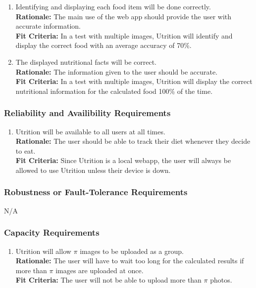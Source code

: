 \documentclass[12pt]{article}
\begin{document}
{\begin{enumerate}[start=4,label={PR\arabic*.}]
	\item Identifying and displaying each food item will be done correctly. \\
	\textbf{Rationale:} The main use of the web app should provide the user with accurate information. \\
	\textbf{Fit Criteria:} In a test with multiple images, Utrition will identify and display the correct food with an average accuracy of 70\%.
	\item  The displayed nutritional facts will be correct. \\
	\textbf{Rationale:} The information given to the user should be accurate. \\
	\textbf{Fit Criteria:} In a test with multiple images, Utrition will display the correct nutritional information for the calculated food 100\% of the time.
\end{enumerate}

\subsubsection{Reliability and Availibility Requirements}

\begin{enumerate}[{PR}6. ] 
	\item Utrition will be available to all users at all times.\\
	\textbf{Rationale:} The user should be able to track their diet whenever they decide to eat. \\
	\textbf{Fit Criteria:} Since Utrition is a local webapp, the user will always be allowed to use Utrition unless their device is down.
\end{enumerate}

\subsubsection{Robustness or Fault-Tolerance Requirements}
\hspace{1.5cm}N/A

\subsubsection{Capacity Requirements}

\begin{enumerate}[{PR}7. ] 
	\item Utrition will allow $\pi$ images to be uploaded as a group.\\
	\textbf{Rationale:} The user will have to wait too long for the calculated results if more than $\pi$ images are uploaded at once. \\
	\textbf{Fit Criteria:} The user will not be able to upload more than $\pi$ photos.
\end{enumerate}

}
\end{document}
